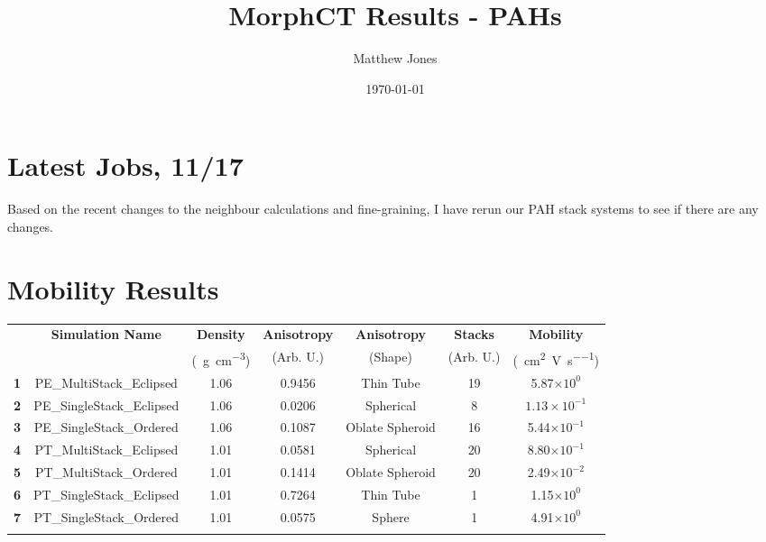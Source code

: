 \documentclass[12pt]{article}
\title{MorphCT Results - PAHs}
\author{Matthew Jones}
\date{\today}
\def\mobunits{\square\centi\meter\per\volt\per\second}
\def\gcm{\gram\per\cubic\centi\meter}
\def\ccg{\cellcolor{gray}}
\begin{document}
\maketitle


\section{Latest Jobs, 11/17}


Based on the recent changes to the neighbour calculations and fine-graining, I have rerun our PAH stack systems to see if there are any changes.


\section{Mobility Results}


\begin{center}
\begin{tabular}{| c | c | c | c | c | c | c |}
\hline
\rule{0pt}{2.5ex} 
\multirow{2}{*}{\textbf{ID}}&\multirow{2}{*}{\textbf{Simulation Name}}&\textbf{Density}&\textbf{Anisotropy}&\textbf{Anisotropy}&\textbf{Stacks}&\textbf{Mobility}\\
                            &&(\SI{}{\gcm})&(Arb. U.)&(Shape)&(Arb. U.)&(\SI{}{\mobunits})\\
\hhline{|=======|}
\textbf{\ccg1}&\rule{0pt}{2.5ex}\ccg PE\_MultiStack\_Eclipsed&\ccg 1.06&\ccg 0.9456&\ccg Thin Tube&\ccg19&\ccg5.87$\times 10^{0}$\\
\textbf{2}&\rule{0pt}{2.5ex}PE\_SingleStack\_Eclipsed&1.06&0.0206&Spherical&8&$1.13\times 10^{-1}$\\
\textbf{\ccg3}&\rule{0pt}{2.5ex}\ccg PE\_SingleStack\_Ordered&\ccg 1.06&\ccg 0.1087&\ccg Oblate Spheroid&\ccg16&\ccg5.44$\times 10^{-1}$\\
\hhline{|=======|}
\textbf{4}&\rule{0pt}{2.5ex}PT\_MultiStack\_Eclipsed&1.01&0.0581&Spherical&20&8.80$\times 10^{-1}$\\
\textbf{\ccg5}&\rule{0pt}{2.5ex}\ccg PT\_MultiStack\_Ordered&\ccg 1.01&\ccg 0.1414&\ccg Oblate Spheroid&\ccg20&\ccg2.49$\times 10^{-2}$\\
\textbf{6}&\rule{0pt}{2.5ex}PT\_SingleStack\_Eclipsed&1.01&0.7264&Thin Tube&1&1.15$\times 10^{0}$\\
\textbf{\ccg7}&\rule{0pt}{2.5ex}\ccg PT\_SingleStack\_Ordered&\ccg 1.01&\ccg 0.0575&\ccg Sphere&\ccg1&\ccg4.91$\times 10^{0}$\\
\hhline{-------}
\end{tabular}\label{table:mob}
\end{center}
\end{document}
